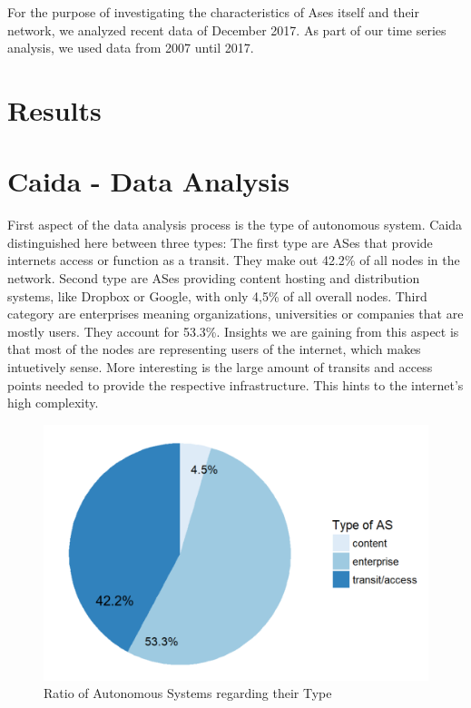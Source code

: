 \documentclass[conference]{IEEEtran}
\begin{document}
For the purpose of investigating the characteristics of Ases itself and their network, we analyzed recent data of December 2017.  As part of our time series analysis, we used data from 2007 until 2017. 


\section{Results}

\section{Caida - Data Analysis}
First aspect of the data analysis process is the type of autonomous system. Caida distinguished here between three types: The first type are ASes that provide internets access or function as a transit. They make out 42.2\% of all nodes in the network. Second type are ASes providing content hosting and distribution systems, like Dropbox or Google, with only 4,5\% of all overall nodes. Third category are enterprises meaning organizations, universities or companies that are mostly users. They account for 53.3\%. Insights we are gaining from this aspect is that most of the nodes are representing users of the internet, which makes intuetively sense. More interesting is the large amount of transits and access points needed to provide the respective infrastructure. This hints to the internet's high complexity. 


\begin{figure}[htbp]
\centerline{\includegraphics[scale=0.4]{Graphics/typeofAS.PNG}}
\caption{Ratio of Autonomous Systems regarding their Type }
\label{fig}
\end{figure}
\end{document}
